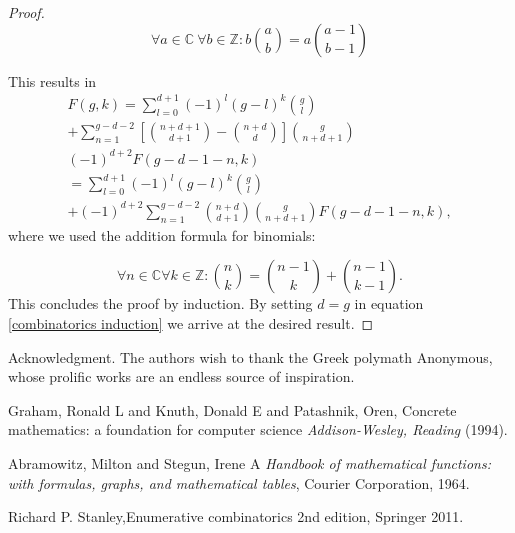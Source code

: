 \documentclass{article}
\theoremstyle{theorem}
\theoremstyle{definition}
\begin{document}
\begin{proof}
\begin{equation}\tag{absorption identity}
\forall a \in \mathbb{C}\ \forall b \in \mathbb{Z}: b \binom{a}{b} = a \binom{a-1}{b-1} 
\end{equation}

This results in
\begin{multline}
F(g,k)= \sum_{l=0}^{d+1} (-1)^l (g-l)^k \binom{g}{l}\\
+ \sum_{n=1}^{g-d-2}\left[\binom{n+d+1}{d+1} - \binom{n+d}{d}\right] \binom{g}{n+d+1} 
\\(-1)^{d+2} F(g-d-1-n,k)\\
=\sum_{l=0}^{d+1} (-1)^l (g-l)^k \binom{g}{l}\\
+(-1)^{d+2}  \sum_{n=1}^{g-d-2} \binom{n+d}{d+1} \binom{g}{n+d+1}  F(g-d-1-n,k),
\end{multline}
where we used the addition formula for binomials:

\begin{equation}
\forall n\in \mathbb{C} \forall k \in \mathbb{Z}: \binom{n}{k} = \binom{n-1}{k} + \binom{n-1}{k-1}.
\end{equation}
This concludes the proof by induction. By setting \(d=g\) in equation \eqref{combinatorics induction} 
we arrive at the desired result.
\end{proof}



\begin{acknowledgment}{Acknowledgment.}
The authors wish to thank the Greek polymath Anonymous, whose prolific works are an endless source of inspiration.
\end{acknowledgment}




\begin{thebibliography}{1}
 Graham, Ronald L and Knuth, Donald E and Patashnik, Oren, Concrete mathematics: a foundation for computer science \textit{Addison-Wesley, Reading} (1994).

 Abramowitz, Milton and Stegun, Irene A \textit{Handbook of mathematical functions: with formulas, graphs, and mathematical tables}, Courier Corporation, 1964.

Richard P. Stanley,Enumerative combinatorics 2nd edition, Springer 2011.

\end{thebibliography}

%
\end{document}
